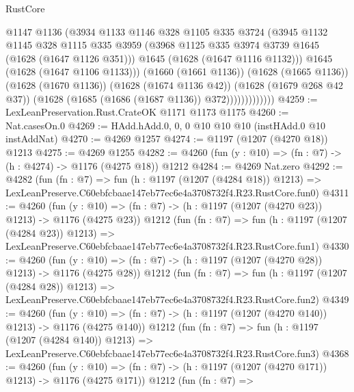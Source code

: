 \begin{lexlean}{RustCore}
\begin{coremodule}
                          @1147
                          @1136
                          (@3934
                            @1133
                            @1146
                            @328
                            @1105
                            @335
                            @3724
                            (@3945
                              @1132
                              @1145
                              @328
                              @1115
                              @335
                              @3959
                              (@3968 @1125 @335 @3974 @3739 @1645 (@1628 (@1647 @1126 @351)))
                              @1645
                              (@1628 (@1647 @1116 @1132)))
                            @1645
                            (@1628 (@1647 @1106 @1133)))
                          (@1660 (@1661 @1136))
                          (@1628 (@1665 @1136))
                          (@1628 (@1670 @1136))
                          (@1628 (@1674 @1136 @42))
                          (@1628 (@1679 @268 @42 @37))
                          (@1628 (@1685 (@1686 (@1687 @1136)) @372)))))))))))))
@4259 := LexLeanPreservation.Rust.CrateOK @1171 @1173 @1175
@4260 := Nat.casesOn.{0}
@4269 := HAdd.hAdd.{0, 0, 0} @10 @10 @10 (instHAdd.{0} @10 instAddNat)
@4270 := @4269 @1257
@4274 := @1197 (@1207 (@4270 @18)) @1213
@4275 := @4269 @1255
@4282 := @4260 (fun (y : @10) => (fn : @7) -> (h : @4274) -> @1176 (@4275 @18)) @1212
@4284 := @4269 Nat.zero
@4292 := @4282
    (fun (fn : @7) =>
    fun (h : @1197 (@1207 (@4284 @18)) @1213) =>
    LexLeanPreserve.C60ebfcbaae147eb77ec6e4a3708732f4.R23.RustCore.fun0)
@4311 := @4260
    (fun (y : @10) => (fn : @7) -> (h : @1197 (@1207 (@4270 @23)) @1213) -> @1176 (@4275 @23))
    @1212
    (fun (fn : @7) =>
    fun (h : @1197 (@1207 (@4284 @23)) @1213) =>
    LexLeanPreserve.C60ebfcbaae147eb77ec6e4a3708732f4.R23.RustCore.fun1)
@4330 := @4260
    (fun (y : @10) => (fn : @7) -> (h : @1197 (@1207 (@4270 @28)) @1213) -> @1176 (@4275 @28))
    @1212
    (fun (fn : @7) =>
    fun (h : @1197 (@1207 (@4284 @28)) @1213) =>
    LexLeanPreserve.C60ebfcbaae147eb77ec6e4a3708732f4.R23.RustCore.fun2)
@4349 := @4260
    (fun (y : @10) => (fn : @7) -> (h : @1197 (@1207 (@4270 @140)) @1213) -> @1176 (@4275 @140))
    @1212
    (fun (fn : @7) =>
    fun (h : @1197 (@1207 (@4284 @140)) @1213) =>
    LexLeanPreserve.C60ebfcbaae147eb77ec6e4a3708732f4.R23.RustCore.fun3)
@4368 := @4260
    (fun (y : @10) => (fn : @7) -> (h : @1197 (@1207 (@4270 @171)) @1213) -> @1176 (@4275 @171))
    @1212
    (fun (fn : @7) =>

\end{coremodule}
\end{lexlean}
